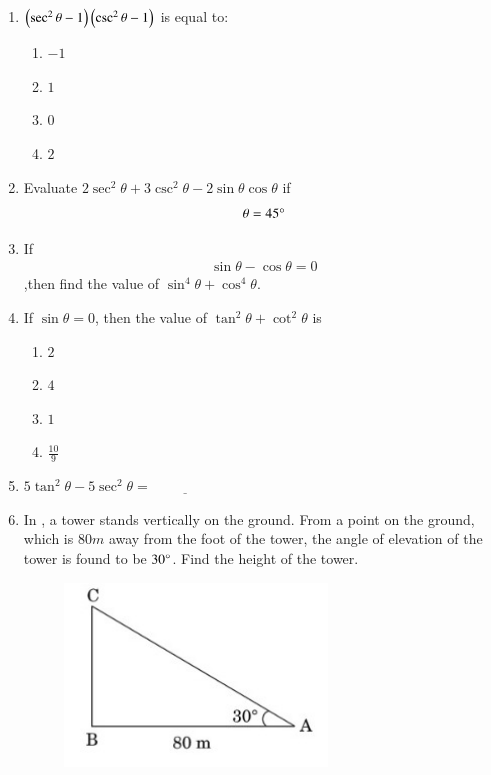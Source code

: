 \begin{enumerate}
    \hfill{}\item $\left(\sec^2\theta - 1\right)\left(\csc^2\theta - 1\right)$  is equal to:
    \begin{enumerate}
   \item $-1$
   \item  $1$
   \item  $0$
   \item  $2$
        \end{enumerate}
   \hfill{}\item Evaluate $2\sec^2\theta+3\csc^2\theta-2\sin\theta\cos\theta$ if
   \begin{align}
      \theta=45\degree
   \end{align}
   
   \hfill{}\item If
   \begin{align}
       \sin\theta-\cos\theta=0
   \end{align}
   ,then find the value of $\sin^4\theta+\cos^4\theta$.
  \hfill{}
    \item If $\sin \theta=0$, then the value of $\tan^2\theta+\cot^2\theta$ is
    \begin{enumerate}
        \item $2$
        \item $4$
        \item $1$
        \item $\frac{10}{9}$
    \end{enumerate}
    \hfill{}\item $5\tan^2 \theta - 5\sec^2\theta = \underline{\hspace{2cm}}$
    \hfill{}\item In  , a tower stands vertically on the ground. From a point on the ground, which is $80m$ away from the foot of the tower, the angle of elevation of the tower is found to be $30\degree$. Find the height of the tower.
    \begin{figure}[H]
        \centering
        \includegraphics[width=70mm]{cbse-math/figs/as.jpeg}

\end{figure}
\end{enumerate}
